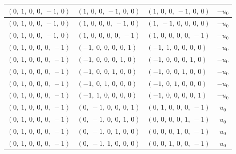 \documentclass[11pt]{article}
\theoremstyle{definition}
\begin{document}
\begin{longtable}{|l|l|l|c|}
    \hline
    $\left( 0, \  1, \  0, \  0, \  -1, \  0\right)$ & $\left( 1, \  0, \  0, \  -1, \  0, \  0\right)$ & $\left( 1, \  0, \  0, \  -1, \  0, \  0\right)$ & $- u_{0}$ \\
    \hline
    $\left( 0, \  1, \  0, \  0, \  -1, \  0\right)$ & $\left( 1, \  0, \  0, \  0, \  -1, \  0\right)$ & $\left( 1, \  -1, \  0, \  0, \  0, \  0\right)$ & $- u_{0}$ \\
    \hline
    $\left( 0, \  1, \  0, \  0, \  -1, \  0\right)$ & $\left( 1, \  0, \  0, \  0, \  0, \  -1\right)$ & $\left( 1, \  0, \  0, \  0, \  0, \  -1\right)$ & $- u_{0}$ \\
    \hline
    $\left( 0, \  1, \  0, \  0, \  0, \  -1\right)$ & $\left( -1, \  0, \  0, \  0, \  0, \  1\right)$ & $\left( -1, \  1, \  0, \  0, \  0, \  0\right)$ & $- u_{0}$ \\
    \hline
    $\left( 0, \  1, \  0, \  0, \  0, \  -1\right)$ & $\left( -1, \  0, \  0, \  0, \  1, \  0\right)$ & $\left( -1, \  0, \  0, \  0, \  1, \  0\right)$ & $- u_{0}$ \\
    \hline
    $\left( 0, \  1, \  0, \  0, \  0, \  -1\right)$ & $\left( -1, \  0, \  0, \  1, \  0, \  0\right)$ & $\left( -1, \  0, \  0, \  1, \  0, \  0\right)$ & $- u_{0}$ \\
    \hline
    $\left( 0, \  1, \  0, \  0, \  0, \  -1\right)$ & $\left( -1, \  0, \  1, \  0, \  0, \  0\right)$ & $\left( -1, \  0, \  1, \  0, \  0, \  0\right)$ & $- u_{0}$ \\
    \hline
    $\left( 0, \  1, \  0, \  0, \  0, \  -1\right)$ & $\left( -1, \  1, \  0, \  0, \  0, \  0\right)$ & $\left( -1, \  0, \  0, \  0, \  0, \  1\right)$ & $- u_{0}$ \\
    \hline
    $\left( 0, \  1, \  0, \  0, \  0, \  -1\right)$ & $\left( 0, \  -1, \  0, \  0, \  0, \  1\right)$ & $\left( 0, \  1, \  0, \  0, \  0, \  -1\right)$ & $u_{0}$ \\
    \hline
    $\left( 0, \  1, \  0, \  0, \  0, \  -1\right)$ & $\left( 0, \  -1, \  0, \  0, \  1, \  0\right)$ & $\left( 0, \  0, \  0, \  0, \  1, \  -1\right)$ & $u_{0}$ \\
    \hline
    $\left( 0, \  1, \  0, \  0, \  0, \  -1\right)$ & $\left( 0, \  -1, \  0, \  1, \  0, \  0\right)$ & $\left( 0, \  0, \  0, \  1, \  0, \  -1\right)$ & $u_{0}$ \\
    \hline
    $\left( 0, \  1, \  0, \  0, \  0, \  -1\right)$ & $\left( 0, \  -1, \  1, \  0, \  0, \  0\right)$ & $\left( 0, \  0, \  1, \  0, \  0, \  -1\right)$ & $u_{0}$ \\

\end{longtable}
\end{document}
